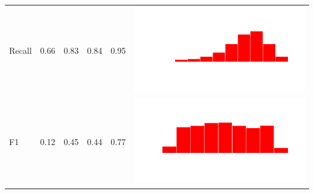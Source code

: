 \begin{table}
\begin{tabular}{lrrrrc}
    Recall & 0.66 & 0.83 & 0.84 & 0.95 & \includegraphics[scale = 0.1, clip = true, trim= 50px 60px 50px 60px]{../figs/hist-results/hist-LRrec.pdf} \\
    F1 & 0.12 & 0.45 & 0.44 & 0.77 & \includegraphics[scale = 0.1, clip = true, trim= 50px 60px 50px 60px]{../figs/hist-results/hist-LRf1.pdf} \\


\end{tabular}
\end{table}
